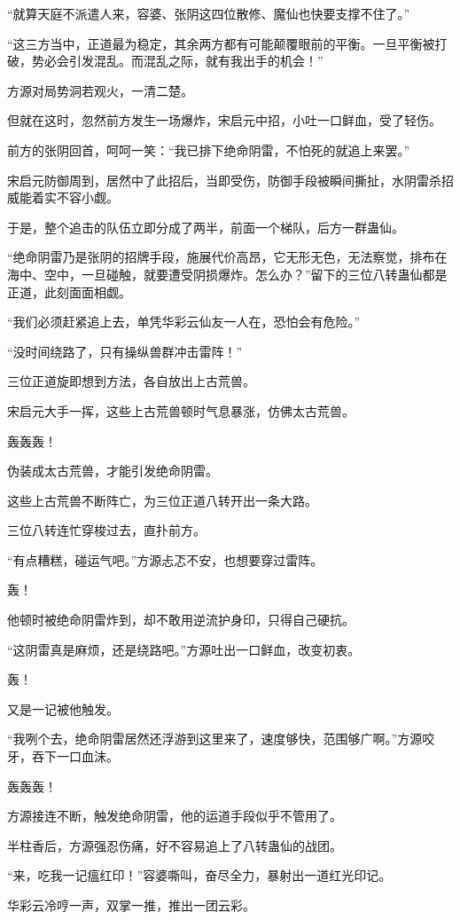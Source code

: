 \begin{this_body}
“就算天庭不派遣人来，容婆、张阴这四位散修、魔仙也快要支撑不住了。”

“这三方当中，正道最为稳定，其余两方都有可能颠覆眼前的平衡。一旦平衡被打破，势必会引发混乱。而混乱之际，就有我出手的机会！”

方源对局势洞若观火，一清二楚。

但就在这时，忽然前方发生一场爆炸，宋启元中招，小吐一口鲜血，受了轻伤。

前方的张阴回首，呵呵一笑：“我已排下绝命阴雷，不怕死的就追上来罢。”

宋启元防御周到，居然中了此招后，当即受伤，防御手段被瞬间撕扯，水阴雷杀招威能着实不容小觑。

于是，整个追击的队伍立即分成了两半，前面一个梯队，后方一群蛊仙。

“绝命阴雷乃是张阴的招牌手段，施展代价高昂，它无形无色，无法察觉，排布在海中、空中，一旦碰触，就要遭受阴损爆炸。怎么办？”留下的三位八转蛊仙都是正道，此刻面面相觑。

“我们必须赶紧追上去，单凭华彩云仙友一人在，恐怕会有危险。”

“没时间绕路了，只有操纵兽群冲击雷阵！”

三位正道旋即想到方法，各自放出上古荒兽。

宋启元大手一挥，这些上古荒兽顿时气息暴涨，仿佛太古荒兽。

轰轰轰！

伪装成太古荒兽，才能引发绝命阴雷。

这些上古荒兽不断阵亡，为三位正道八转开出一条大路。

三位八转连忙穿梭过去，直扑前方。

“有点糟糕，碰运气吧。”方源忐忑不安，也想要穿过雷阵。

轰！

他顿时被绝命阴雷炸到，却不敢用逆流护身印，只得自己硬抗。

“这阴雷真是麻烦，还是绕路吧。”方源吐出一口鲜血，改变初衷。

轰！

又是一记被他触发。

“我咧个去，绝命阴雷居然还浮游到这里来了，速度够快，范围够广啊。”方源咬牙，吞下一口血沫。

轰轰轰！

方源接连不断，触发绝命阴雷，他的运道手段似乎不管用了。

半柱香后，方源强忍伤痛，好不容易追上了八转蛊仙的战团。

“来，吃我一记瘟红印！”容婆嘶叫，奋尽全力，暴射出一道红光印记。

华彩云冷哼一声，双掌一推，推出一团云彩。


\end{this_body}
